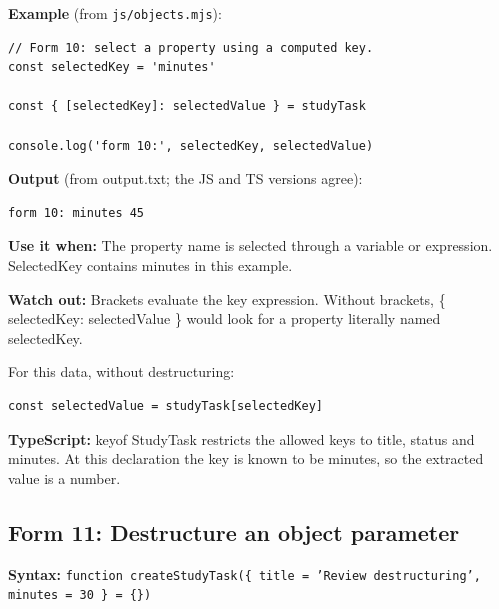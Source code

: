 \documentclass[10pt,a4paper]{article}
\begin{document}

\textbf{Example} (from \texttt{js/\allowbreak{}objects.\allowbreak{}mjs}):

\begin{lstlisting}[language=GuideJS]
// Form 10: select a property using a computed key.
const selectedKey = 'minutes'

const { [selectedKey]: selectedValue } = studyTask

console.log('form 10:', selectedKey, selectedValue)
\end{lstlisting}


\textbf{Output} (from output.txt; the JS and TS versions agree):

\begin{lstlisting}[language={}]
form 10: minutes 45
\end{lstlisting}

\textbf{Use it when:} The property name is selected through a variable or expression. SelectedKey contains minutes in this example.

\textbf{Watch out:} Brackets evaluate the key expression. Without brackets, \{ selectedKey: selectedValue \} would look for a property literally named selectedKey.


For this data, without destructuring:

\begin{lstlisting}[language=GuideJS]
const selectedValue = studyTask[selectedKey]
\end{lstlisting}

\textbf{TypeScript:} keyof StudyTask restricts the allowed keys to title, status and minutes. At this declaration the key is known to be minutes, so the extracted value is a number.

\subsection{Form 11: Destructure an object parameter}

\textbf{Syntax:} \texttt{function create\allowbreak{}Study\allowbreak{}Task(\{ title =\allowbreak{} 'Review destructuring',\allowbreak{} minutes =\allowbreak{} 30 \} =\allowbreak{} \{\})}

\end{document}
